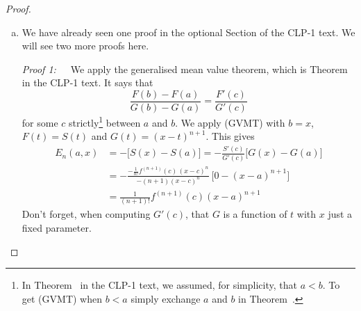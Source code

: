 \begin{proof}
\begin{enumerate}[(a)]
\begin{itemize}
\begin{itemize}
\item $P(3)$ is true by the second bullet with $n=2$ 
\item and so on, for ever and ever.
\end{itemize}
That tells us that $P(n)$ is true for all integers $n\ge 0$, which is 
exactly part (a) of the theorem. This proof technique is called mathematical
induction\footnote{While the use of the ideas of induction goes back over 2000 years,
the first recorded rigorous use of induction appeared in the work of Levi ben Gershon (1288--1344, better known as Gersonides). The first explicit formulation of mathematical induction was given by the French mathematician Blaise Pascal in 1665.}.  
\end{itemize}


\item
We have already seen one proof in the optional Section  of the CLP-1 text. We will see two more proofs here.

\emph{Proof 1:}\ \ \  We apply the generalised mean value theorem, which 
is Theorem~ in the CLP-1 text. It says that
\begin{equation*}
\frac{F(b)-F(a)}{G(b)-G(a)} = \frac{F'(c)}{G'(c)}
\tag{GMVT}\end{equation*}
for some $c$ strictly\footnote{In Theorem~ in the CLP-1 text, we assumed, for simplicity, that $a < b$. To get (GVMT) when $b < a$ simply exchange $a$ and $b$ in Theorem~.} between $a$ and $b$. We apply (GVMT) with
$b=x$, $F(t)=S(t)$ and $G(t)=(x-t)^{n+1}$. This gives
\begin{align*}
E_n(a,x)
&= -\big[S(x)-S(a)\big] =-\frac{S'(c)}{G'(c)}\big[G(x)-G(a)\big] \\
&=-\frac{ -\frac{1}{n!}  f^{(n+1)}(c)\,(x-c)^n}{-(n+1)(x-c)^n}\ 
         \big[0-(x-a)^{n+1}\big]\\
&=\frac{1}{(n+1)!}f^{(n+1)}(c)(x-a)^{n+1}
\end{align*}
Don't forget, when computing $G'(c)$, that $G$ is a function of $t$ with
$x$ just a fixed parameter.



\end{enumerate}
\end{proof}
